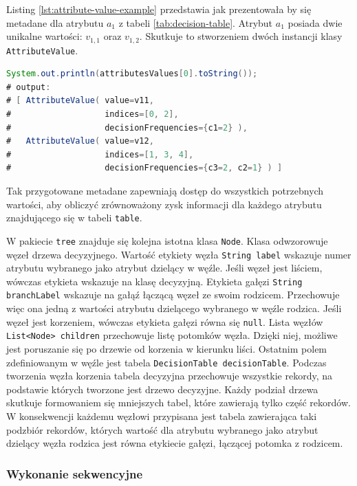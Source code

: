 \documentclass[12pt]{article}
\begin{document}
Listing \ref{lst:attribute-value-example} przedstawia jak prezentowała by się metadane dla atrybutu $a_1$ z tabeli \ref{tab:decision-table}.
Atrybut $a_1$ posiada dwie unikalne wartości: $v_{1,1}$ oraz $v_{1,2}$. Skutkuje to stworzeniem dwóch instancji klasy \verb|AttributeValue|.

\begin{lstlisting}[language=java, caption=Metadane na przykładzie atrybutu $a_1$ z tabeli \ref{tab:decision-table},frame=single,label={lst:attribute-value-example}]
System.out.println(attributesValues[0].toString());
# output:
# [ AttributeValue( value=v11,
#                   indices=[0, 2],
#                   decisionFrequencies={c1=2} ),
#   AttributeValue( value=v12,
#                   indices=[1, 3, 4],
#                   decisionFrequencies={c3=2, c2=1} ) ]
\end{lstlisting}
    
Tak przygotowane metadane zapewniają dostęp do wszystkich potrzebnych wartości, aby obliczyć zrównoważony zysk informacji dla każdego
atrybutu znajdującego się w tabeli \verb|table|.

W pakiecie \verb|tree| znajduje się kolejna istotna klasa \verb|Node|. Klasa odwzorowuje węzeł drzewa decyzyjnego.
Wartość etykiety węzła \verb|String label| wskazuje numer atrybutu wybranego jako atrybut dzielący w węźle. Jeśli węzeł jest liściem, wówczas etykieta wskazuje na klasę decyzyjną.
Etykieta gałęzi \verb|String branchLabel| wskazuje na gałąź łączącą węzeł ze swoim rodzicem. Przechowuje więc ona jedną z wartości atrybutu dzielącego wybranego w węźle rodzica.
Jeśli węzeł jest korzeniem, wówczas etykieta gałęzi równa się \verb|null|. Lista węzłów \verb|List<Node> children| przechowuje listę potomków węzła. Dzięki niej, możliwe jest poruszanie się
po drzewie od korzenia w kierunku liści. Ostatnim polem zdefiniowanym w węźle jest tabela \verb|DecisionTable decisionTable|. Podczas tworzenia węzła korzenia tabela decyzyjna przechowuje
wszystkie rekordy, na podstawie których tworzone jest drzewo decyzyjne. Każdy podział drzewa skutkuje formowaniem się mniejszych tabel, które zawierają tylko część rekordów. W konsekwencji
każdemu węzłowi przypisana jest tabela zawierająca taki podzbiór rekordów, których wartość dla atrybutu wybranego jako atrybut dzielący węzła rodzica jest równa etykiecie gałęzi, łączącej
potomka z rodzicem.

\subsubsection{Wykonanie sekwencyjne}
\end{document}
